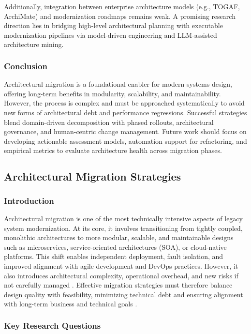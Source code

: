 \documentclass[12pt]{article}
\begin{document}
Additionally, integration between enterprise architecture models (e.g., TOGAF, ArchiMate) and modernization roadmaps remains weak. A promising research direction lies in bridging high-level architectural planning with executable modernization pipelines via model-driven engineering and LLM-assisted architecture mining.


\subsubsection{Conclusion}

Architectural migration is a foundational enabler for modern systems design, offering long-term benefits in modularity, scalability, and maintainability. However, the process is complex and must be approached systematically to avoid new forms of architectural debt and performance regressions. Successful strategies blend domain-driven decomposition with phased rollouts, architectural governance, and human-centric change management. Future work should focus on developing actionable assessment models, automation support for refactoring, and empirical metrics to evaluate architecture health across migration phases.
\subsection{Architectural Migration Strategies}

\subsubsection{Introduction}

Architectural migration is one of the most technically intensive aspects of legacy system modernization. At its core, it involves transitioning from tightly coupled, monolithic architectures to more modular, scalable, and maintainable designs such as microservices, service-oriented architectures (SOA), or cloud-native platforms. This shift enables independent deployment, fault isolation, and improved alignment with agile development and DevOps practices. However, it also introduces architectural complexity, operational overhead, and new risks if not carefully managed \cite{wolfart2021}. Effective migration strategies must therefore balance design quality with feasibility, minimizing technical debt and ensuring alignment with long-term business and technical goals \cite{lenarduzzi2020, velepucha2023}.

\subsubsection{Key Research Questions}
\end{document}
